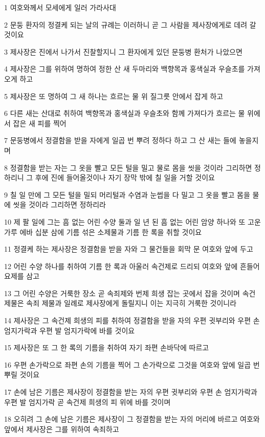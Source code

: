 \par 1 여호와께서 모세에게 일러 가라사대
\par 2 문둥 환자의 정결케 되는 날의 규례는 이러하니 곧 그 사람을 제사장에게로 데려 갈 것이요
\par 3 제사장은 진에서 나가서 진찰할지니 그 환자에게 있던 문둥병 환처가 나았으면
\par 4 제사장은 그를 위하여 명하여 정한 산 새 두마리와 백향목과 홍색실과 우슬초를 가져오게 하고
\par 5 제사장은 또 명하여 그 새 하나는 흐르는 물 위 질그릇 안에서 잡게 하고
\par 6 다른 새는 산대로 취하여 백향목과 홍색실과 우슬초와 함께 가져다가 흐르는 물 위에서 잡은 새 피를 찍어
\par 7 문둥병에서 정결함을 받을 자에게 일곱 번 뿌려 정하다 하고 그 산 새는 들에 놓을지며
\par 8 정결함을 받는 자는 그 옷을 빨고 모든 털을 밀고 물로 몸을 씻을 것이라 그리하면 정하리니 그 후에 진에 들어올것이나 자기 장막 밖에 칠 일을 거할 것이요
\par 9 칠 일 만에 그 모든 털을 밀되 머리털과 수염과 눈썹을 다 밀고 그 옷을 빨고 몸을 물에 씻을 것이라 그리하면 정하리라
\par 10 제 팔 일에 그는 흠 없는 어린 수양 둘과 일 년 된 흠 없는 어린 암양 하나와 또 고운 가루 에바 십분 삼에 기름 섞은 소제물과 기름 한 록을 취할 것이요
\par 11 정결케 하는 제사장은 정결함을 받을 자와 그 물건들을 회막 문 여호와 앞에 두고
\par 12 어린 수양 하나를 취하여 기름 한 록과 아울러 속건제로 드리되 여호와 앞에 흔들어 요제를 삼고
\par 13 그 어린 수양은 거룩한 장소 곧 속죄제와 번제 희생 잡는 곳에서 잡을 것이며 속건 제물은 속죄 제물과 일례로 제사장에게 돌릴지니 이는 지극히 거룩한 것이니라
\par 14 제사장은 그 속건제 희생의 피를 취하여 정결함을 받을 자의 우편 귓부리와 우편 손 엄지가락과 우편 발 엄지가락에 바를 것이요
\par 15 제사장은 또 그 한 록의 기름을 취하여 자기 좌편 손바닥에 따르고
\par 16 우편 손가락으로 좌편 손의 기름을 찍어 그 손가락으로 그것을 여호와 앞에 일곱 번 뿌릴 것이요
\par 17 손에 남은 기름은 제사장이 정결함을 받는 자의 우편 귓부리와 우편 손 엄지가락과 우편 발 엄지가락 곧 속건제 희생의 피 위에 바를 것이며
\par 18 오히려 그 손에 남은 기름은 제사장이 그 정결함을 받는 자의 머리에 바르고 여호와 앞에서 제사장은 그를 위하여 속죄하고
